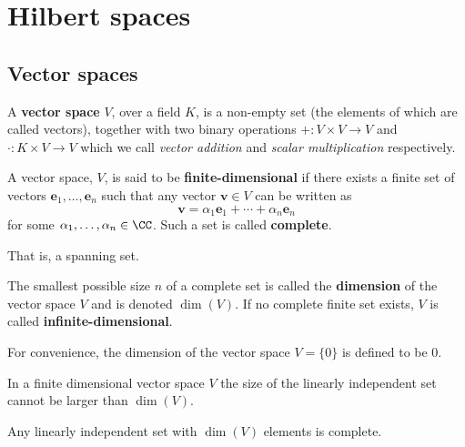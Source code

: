 \documentclass[12pt, a4paper]{article}
\begin{document}
\section{Hilbert spaces}

\subsection{Vector spaces}

\begin{definition}
    A \textbf{vector space} \(V\), over a field \(K\), is a non-empty set (the elements of which are called vectors), together with two binary operations \(+ : V\times V \to V\) and \(\cdot : K \times V \to V\) which we call \textit{vector addition} and \textit{scalar multiplication} respectively.
\end{definition}

\begin{definition}
    A vector space, \(V\), is said to be \textbf{finite-dimensional} if there exists a finite set of vectors \(\bm{e}_1, \ldots, \bm{e}_n\) such that any vector \(\bm{v} \in V\) can be written as 
    \[\bm{v} = \alpha_1 \bm{e}_1 + \cdots + \alpha_n \bm{e}_n\]
    for some \(\alpha_1,\ldots, \alpha_n \in \CC\). Such a set is called \textbf{complete}. 
\end{definition}

\begin{mdremark}
    That is, a spanning set.
\end{mdremark}

\begin{definition}
    The smallest possible size \(n\) of a complete set is called the \textbf{dimension} of the vector space \(V\) and is denoted \(\dim(V)\). If no complete finite set exists, \(V\) is called \textbf{infinite-dimensional}.
\end{definition}

\begin{mdremark}
    For convenience, the dimension of the vector space \(V =\{0\}\) is defined to be \(0\).
\end{mdremark}

\begin{theorem}
    In a finite dimensional vector space \(V\) the size of the linearly independent set cannot be larger than \(\dim(V)\).
\end{theorem}

\begin{corollary}
    Any linearly independent set with \(\dim(V)\) elements is complete.
\end{corollary}
\end{document}
